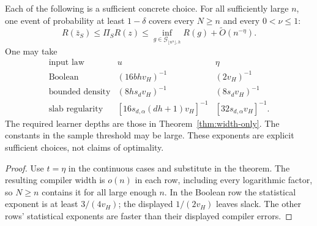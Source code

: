 \begin{corollary}
\label{cor:literal-poly-width}
Each of the following is a sufficient concrete choice. For all
sufficiently large $n$, one event of probability at least $1-\delta$
covers every $N\ge n$ and every $0<\nu\le1$:
\[
 R(\bar z_S)\le\Pi_SR(z)
       \le\inf_{g\in\mathcal G_{\lfloor n^u\rfloor,h}}R(g)
                                   +\widetilde O(n^{-\eta}).
\]
One may take
\[
\begin{array}{c|c|c}
\text{input law}&u&\eta\\ \hline
\text{Boolean}&(16bhv_H)^{-1}&(2v_H)^{-1}\\
\text{bounded density}&(8hs_dv_H)^{-1}&(8s_dv_H)^{-1}\\
\text{slab regularity}&[16s_{d,\alpha}(dh+1)v_H]^{-1}
                                      &[32s_{d,\alpha}v_H]^{-1}.
\end{array}
\]
The required learner depths are those in Theorem~\ref{thm:width-only}.
The constants in the sample threshold may be large. These exponents
are explicit sufficient choices, not claims of optimality.
\end{corollary}
\begin{proof}
Use $t=\eta$ in the continuous cases and substitute in the theorem.
The resulting compiler width is $o(n)$ in each row, including every
logarithmic factor, so $N\ge n$ contains it for all large enough $n$.
In the Boolean row the statistical exponent is at least
$3/(4v_H)$; the displayed $1/(2v_H)$ leaves slack. The other rows'
statistical exponents are faster than their displayed compiler errors.
\end{proof}
